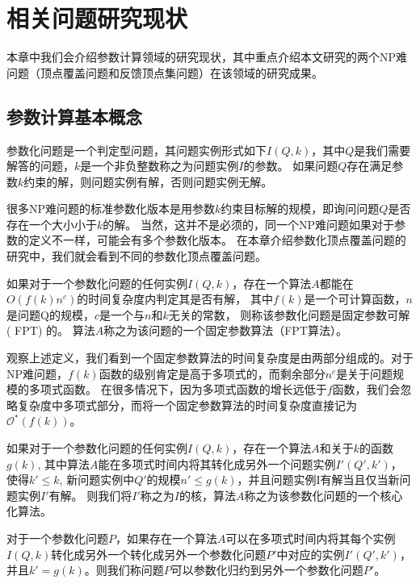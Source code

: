 \chapter{相关问题研究现状}
本章中我们会介绍参数计算领域的研究现状，其中重点介绍本文研究的两个NP难问题（顶点覆盖问题和反馈顶点集问题）在该领域的研究成果。
\section{参数计算基本概念}
\begin{definition} [参数化问题]
参数化问题是一个判定型问题，其问题实例形式如下$I(Q, k)$，其中$Q$是我们需要解答的问题，$k$是一个非负整数称之为问题实例$I$的参数。
如果问题$Q$存在满足参数$k$约束的解，则问题实例有解，否则问题实例无解。
\end{definition}

很多NP难问题的标准参数化版本是用参数$k$约束目标解的规模，即询问问题$Q$是否存在一个大小小于$k$的解。
当然，这并不是必须的，同一个NP难问题如果对于参数的定义不一样，可能会有多个参数化版本。
在本章介绍参数化顶点覆盖问题的研究中，我们就会看到不同的参数化顶点覆盖问题。

\begin{definition}  \label{def_fpt}
如果对于一个参数化问题的任何实例$I(Q, k)$，存在一个算法$A$都能在$O(f(k)n^c)$的时间复杂度内判定其是否有解，
其中$f(k)$是一个可计算函数，$n$是问题Q的规模，$c$是一个与$n$和$k$无关的常数，
则称该参数化问题是固定参数可解( FPT) 的。
算法$A$称之为该问题的一个固定参数算法（FPT算法）。
\end{definition}

观察上述定义，我们看到一个固定参数算法的时间复杂度是由两部分组成的。对于NP难问题，$f(k)$函数的级别肯定是高于多项式的，而剩余部分$n^c$是关于问题规模的多项式函数。
在很多情况下，因为多项式函数的增长远低于$f$函数，我们会忽略复杂度中多项式部分，而将一个固定参数算法的时间复杂度直接记为$\mathcal{O}^*(f(k))$。

\begin{definition}[核(Kernel)]
如果对于一个参数化问题的任何实例$I(Q, k)$，存在一个算法$A$和关于$k$的函数$g(k)$,
其中算法$A$能在多项式时间内将其转化成另外一个问题实例$I'(Q',k')$，
使得$k' \le k$, 新问题实例中$Q'$的规模$n' \le g(k)$，并且问题实例I有解当且仅当新问题实例$I'$有解。
则我们将$I'$称之为$I$的核，算法$A$称之为该参数化问题的一个核心化算法。
\end{definition}

\begin{definition}
对于一个参数化问题$P$，如果存在一个算法$A$可以在多项式时间内将其每个实例$I(Q, k)$转化成另外一个转化成另外一个参数化问题$P'$中对应的实例$I'(Q', k')$，
并且$k' = g(k)$。则我们称问题$P$可以参数化归约到另外一个参数化问题$P'$。
\end{definition}


